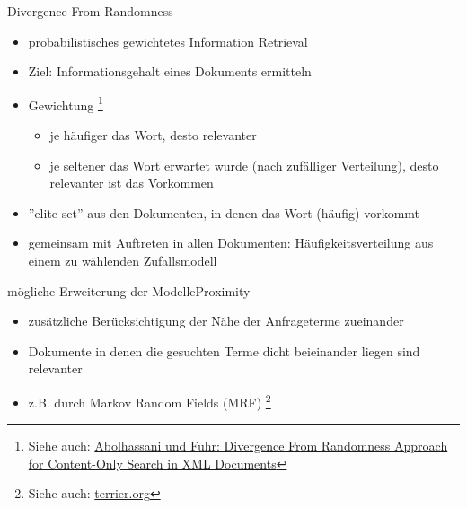 \documentclass{beamer}
\newcommand\blfootnote[1]{%
	\begingroup
	\renewcommand\thefootnote{}\footnote{#1}%
	\addtocounter{footnote}{-1}%
	\endgroup
}
\begin{document}
	\begin{frame}{Divergence From Randomness}
		\begin{itemize}
			\item probabilistisches gewichtetes Information Retrieval
			\item Ziel: Informationsgehalt eines Dokuments ermitteln
		\end{itemize}
		\begin{itemize}[<+->]
			\item Gewichtung \blfootnote{Siehe auch: \href{http://www.is.informatik.uni-duisburg.de/bib/pdf/ir/Abolhassani_Fuhr_04.pdf}{Abolhassani und Fuhr: Divergence From Randomness Approach for Content-Only Search in XML Documents}}
			\begin{itemize}
				\item je häufiger das Wort, desto relevanter
				\item je seltener das Wort erwartet wurde (nach zufälliger Verteilung), desto relevanter ist das Vorkommen
			\end{itemize}
			\item ''elite set'' aus den Dokumenten, in denen das Wort (häufig) vorkommt
			\item gemeinsam mit Auftreten in allen Dokumenten: Häufigkeitsverteilung aus einem zu wählenden Zufallsmodell
		\end{itemize}
	\end{frame}

	\begin{frame}{mögliche Erweiterung der Modelle}{Proximity}
		\begin{itemize}[<+->]
			\item zusätzliche Berücksichtigung der Nähe der Anfrageterme zueinander
			\item Dokumente in denen die gesuchten Terme dicht beieinander liegen sind relevanter
			\item z.B. durch Markov Random Fields (MRF) \blfootnote{Siehe auch: \href{http://terrier.org/docs/v3.5/javadoc/org/terrier/matching/dsms/MRFDependenceScoreModifier.html}{terrier.org}}
		\end{itemize}
	\end{frame}
\end{document}
